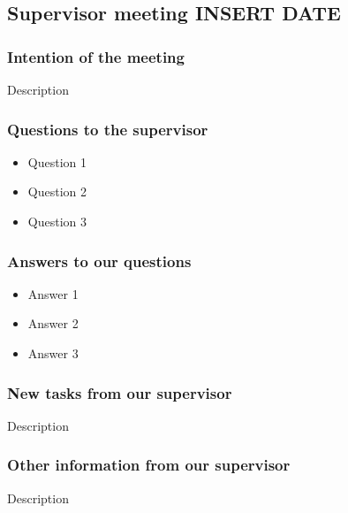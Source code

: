 \begin{center}
\subsection*{Supervisor meeting INSERT DATE}
\end{center}

\bigskip


\subsubsection*{Intention of the meeting}
Description


\subsubsection*{Questions to the supervisor}
\begin{itemize}
    \item Question 1
    \item Question 2
    \item Question 3
\end{itemize}


\subsubsection*{Answers to our questions}
\begin{itemize}
    \item Answer 1
    \item Answer 2
    \item Answer 3
\end{itemize}


\subsubsection*{New tasks from our supervisor}
Description

\subsubsection*{Other information from our supervisor}
Description

\newpage